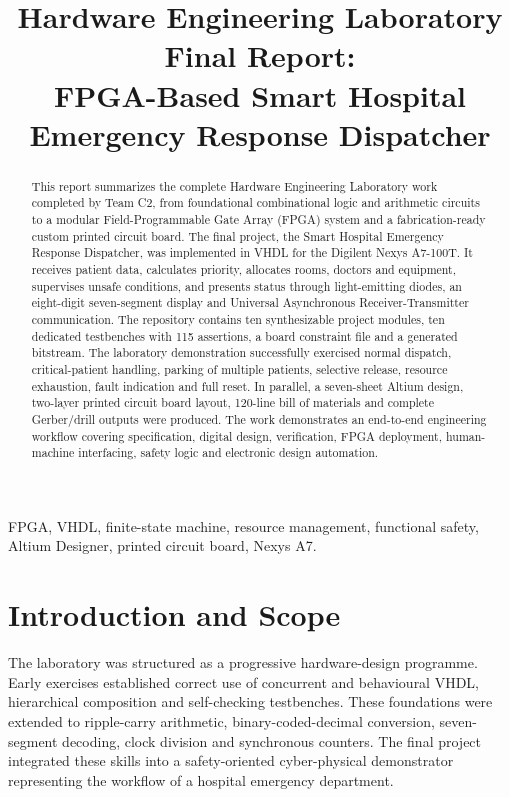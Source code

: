 \documentclass[conference]{IEEEtran}
\newcommand{\HWE}{Smart Hospital Emergency Response Dispatcher}
\begin{document}
\title{Hardware Engineering Laboratory Final Report:\\FPGA-Based Smart Hospital Emergency Response Dispatcher}
\author{
}
\maketitle

\begin{abstract}
This report summarizes the complete Hardware Engineering Laboratory work completed by Team C2, from foundational combinational logic and arithmetic circuits to a modular Field-Programmable Gate Array (FPGA) system and a fabrication-ready custom printed circuit board. The final project, the \HWE, was implemented in VHDL for the Digilent Nexys A7-100T. It receives patient data, calculates priority, allocates rooms, doctors and equipment, supervises unsafe conditions, and presents status through light-emitting diodes, an eight-digit seven-segment display and Universal Asynchronous Receiver-Transmitter communication. The repository contains ten synthesizable project modules, ten dedicated testbenches with 115 assertions, a board constraint file and a generated bitstream. The laboratory demonstration successfully exercised normal dispatch, critical-patient handling, parking of multiple patients, selective release, resource exhaustion, fault indication and full reset. In parallel, a seven-sheet Altium design, two-layer printed circuit board layout, 120-line bill of materials and complete Gerber/drill outputs were produced. The work demonstrates an end-to-end engineering workflow covering specification, digital design, verification, FPGA deployment, human-machine interfacing, safety logic and electronic design automation.
\end{abstract}

\begin{IEEEkeywords}
FPGA, VHDL, finite-state machine, resource management, functional safety, Altium Designer, printed circuit board, Nexys A7.
\end{IEEEkeywords}

\section{Introduction and Scope}
The laboratory was structured as a progressive hardware-design programme. Early exercises established correct use of concurrent and behavioural VHDL, hierarchical composition and self-checking testbenches. These foundations were extended to ripple-carry arithmetic, binary-coded-decimal conversion, seven-segment decoding, clock division and synchronous counters. The final project integrated these skills into a safety-oriented cyber-physical demonstrator representing the workflow of a hospital emergency department.
\end{document}
